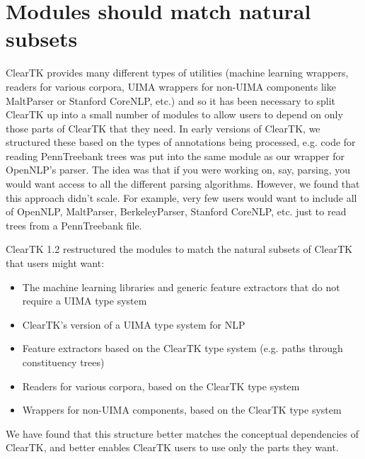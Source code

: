 \documentclass[10pt, a4paper]{article}
\begin{document}
\section{Modules should match natural subsets}
ClearTK provides many different types of utilities (machine learning wrappers, readers for various corpora, UIMA wrappers for non-UIMA components like MaltParser or Stanford CoreNLP, etc.) and so it has been necessary to split ClearTK up into a small number of modules to allow users to depend on only those parts of ClearTK that they need.
In early versions of ClearTK, we structured these based on the types of annotations being processed, e.g. code for reading PennTreebank trees was put into the same module as our wrapper for OpenNLP's parser.
The idea was that if you were working on, say, parsing, you would want access to all the different parsing algorithms.
However, we found that this approach didn't scale.
For example, very few users would want to include all of OpenNLP, MaltParser, BerkeleyParser, Stanford CoreNLP, etc. just to read trees from a PennTreebank file.

ClearTK 1.2 restructured the modules to match the natural subsets of ClearTK that users might want:
\begin{itemize}
\item The machine learning libraries and generic feature extractors that do not require a UIMA type system
\item ClearTK's version of a UIMA type system for NLP
\item Feature extractors based on the ClearTK type system (e.g. paths through constituency trees)
\item Readers for various corpora, based on the ClearTK type system
\item Wrappers for non-UIMA components, based on the ClearTK type system
\end{itemize}
We have found that this structure better matches the conceptual dependencies of ClearTK, and better enables ClearTK users to use only the parts they want.
\end{document}
